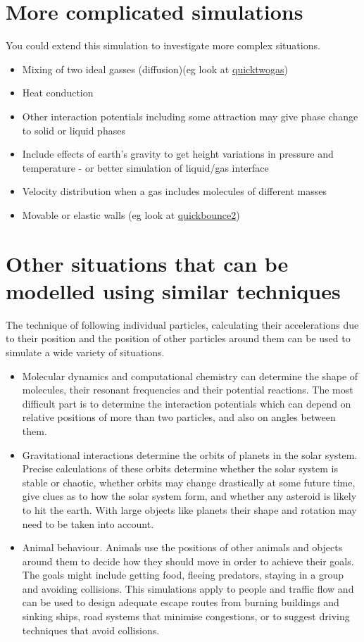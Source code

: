 \documentclass[12pt]{article}
\begin{document}
\section{More complicated simulations}
You could extend this simulation to investigate more complex situations.
\begin{itemize}
\item{Mixing of two ideal gasses (diffusion)(eg look at \href{quicktwogas.html}{quicktwogas})}
\item{Heat conduction}
\item{Other interaction potentials including some attraction may give phase change to
solid or liquid phases}
\item{Include effects of earth's gravity to get height variations in pressure and
temperature - or better simulation of liquid/gas interface}
\item{Velocity distribution when a gas includes molecules of different masses}
\item{Movable or elastic walls (eg look at \href{quickbounce2.html}{quickbounce2})}
\end{itemize}

\section{Other situations that can be modelled using similar techniques}
The technique of following individual particles, calculating their accelerations
due to their position and the position of other particles around them can be used
to simulate a wide variety of situations.
\begin{itemize}

\item{Molecular dynamics and computational chemistry can determine the
shape of molecules, their resonant frequencies and their potential reactions.
The most difficult part is to determine the interaction potentials which can depend on
relative positions of more than two particles, and also on angles between them.}

\item{Gravitational interactions determine the orbits of planets in the solar system.
Precise calculations of these orbits determine whether the solar system is stable or chaotic,
whether orbits may change drastically at some future time, give clues as to how the solar
system form, and whether any asteroid is likely to hit the earth.
With large objects like planets their shape and rotation may need to be taken into account.}

\item{Animal behaviour. Animals use the positions of other animals and objects around them to decide how they
should move in order to achieve their goals. The goals might include getting food, fleeing predators, staying
in a group and avoiding collisions. This simulations apply to people and traffic flow and can be used to design
adequate escape routes from burning buildings and sinking ships, road systems that minimise congestions, or to
suggest driving techniques that avoid collisions.}
\end{itemize}

\end{document}
